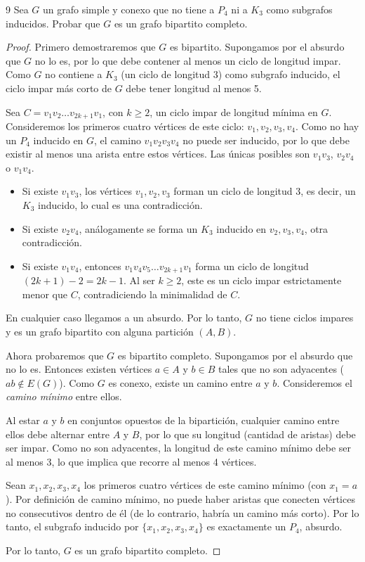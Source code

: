 \begin{ejercicioEntregar}{9}
    Sea \( G \) un grafo simple y conexo que no tiene a \( P_4 \) ni a \( K_3 \) como subgrafos inducidos. Probar que \( G \) es un grafo bipartito completo.
\end{ejercicioEntregar}
\begin{proof}
    Primero demostraremos que \(G\) es bipartito. Supongamos por el absurdo que \(G\) no lo es, por lo que debe contener al menos un ciclo de longitud impar. Como \(G\) no contiene a \(K_3\) (un ciclo de longitud 3) como subgrafo inducido, el ciclo impar más corto de \(G\) debe tener longitud al menos 5.

    Sea \(C = v_1 v_2 \ldots v_{2k+1} v_1\), con \(k \geq 2\), un ciclo impar de longitud mínima en \(G\). Consideremos los primeros cuatro vértices de este ciclo: \(v_1, v_2, v_3, v_4\). Como no hay un \(P_4\) inducido en \(G\), el camino \(v_1 v_2 v_3 v_4\) no puede ser inducido, por lo que debe existir al menos una arista entre estos vértices. Las únicas posibles son \(v_1v_3\), \(v_2v_4\) o \(v_1v_4\).
    \begin{itemize}
        \item Si existe \(v_1v_3\), los vértices \(v_1, v_2, v_3\) forman un ciclo de longitud 3, es decir, un \(K_3\) inducido, lo cual es una contradicción.
        \item Si existe \(v_2v_4\), análogamente se forma un \(K_3\) inducido en \(v_2, v_3, v_4\), otra contradicción.
        \item Si existe \(v_1v_4\), entonces \(v_1 v_4 v_5 \ldots v_{2k+1} v_1\) forma un ciclo de longitud \((2k+1) - 2 = 2k-1\). Al ser \(k \geq 2\), este es un ciclo impar estrictamente menor que \(C\), contradiciendo la minimalidad de \(C\).
    \end{itemize}
    En cualquier caso llegamos a un absurdo. Por lo tanto, \(G\) no tiene ciclos impares y es un grafo bipartito con alguna partición \((A, B)\).

    Ahora probaremos que \(G\) es bipartito completo. Supongamos por el absurdo que no lo es. Entonces existen vértices \(a \in A\) y \(b \in B\) tales que no son adyacentes (\(ab \notin E(G)\)). Como \(G\) es conexo, existe un camino entre \(a\) y \(b\). Consideremos el \emph{camino mínimo} entre ellos.

    Al estar \(a\) y \(b\) en conjuntos opuestos de la bipartición, cualquier camino entre ellos debe alternar entre \(A\) y \(B\), por lo que su longitud (cantidad de aristas) debe ser impar. Como no son adyacentes, la longitud de este camino mínimo debe ser al menos 3, lo que implica que recorre al menos 4 vértices.

    Sean \(x_1, x_2, x_3, x_4\) los primeros cuatro vértices de este camino mínimo (con \(x_1 = a\)). Por definición de camino mínimo, no puede haber aristas que conecten vértices no consecutivos dentro de él (de lo contrario, habría un camino más corto). Por lo tanto, el subgrafo inducido por \( \{x_1, x_2, x_3, x_4\} \) es exactamente un \( P_4 \), absurdo.

    Por lo tanto, \(G\) es un grafo bipartito completo.
\end{proof}

